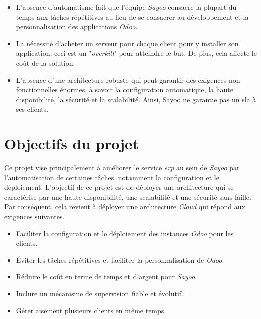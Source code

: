 \begin{onehalfspace}
\begin{itemize}
\item L’absence d'automatisme fait que l'équipe \emph{Sayoo} consacre la plupart du temps aux tâches répétitives au lieu de se consacrer au développement et la personnalisation des applications \emph{Odoo}. 

\item La nécessité d'acheter un serveur pour chaque client pour y installer son application, ceci est un "\emph{overkill}" pour atteindre le but. De plus, cela affecte le coût de la solution.

\item L'absence d'une architecture robuste qui peut garantir des exigences non fonctionnelles énormes, à savoir la configuration automatique, la haute disponibilité, la sécurité et la scalabilité. Ainsi, Sayoo ne garantie pas un \acrshort{sla} à ses clients.

\end{itemize}




\section{Objectifs du projet}
Ce projet vise principalement à améliorer le service \emph{\acrshort{erp}} au sein de \emph{Sayoo} par l'automatisation de certaines tâches, notamment la configuration et le déploiement. L'objectif de ce projet est de déployer une architecture qui se caractérise par une haute disponibilité, une scalabilité et une sécurité sans faille. Par conséquent, cela revient à déployer une architecture \emph{Cloud} qui répond aux exigences suivantes.
\begin{itemize}

\item Faciliter la configuration et le déploiement des instances \emph{Odoo} pour les clients.

\item Éviter les tâches répétitives et faciliter la personnalisation de \emph{Odoo}.

\item Réduire le coût en terme de temps et d'argent pour \emph{Sayoo}.

\item Inclure un mécanisme de supervision fiable et évolutif.

\item Gérer aisément plusieurs clients en même temps.  
 
 \end{itemize}







\end{onehalfspace}
